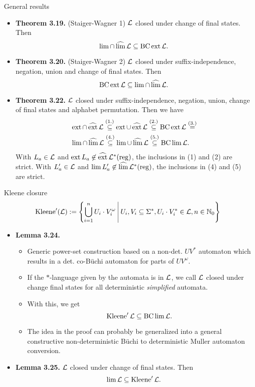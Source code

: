 \documentclass[
	notheorems,noamsthm]{beamer}
\begin{document}
\begin{frame}[<+->]{General results}
\begin{itemize}
\item \textbf{Theorem 3.19.} (Staiger-Wagner 1) $\mathcal{L}$ closed under change of final states. Then
\[ \lim \cap \operatorname{\widehat{lim}} \mathcal{L} \subseteq \operatorname{BC} \operatorname{ext} \mathcal{L} . \]
\item \textbf{Theorem 3.20.} (Staiger-Wagner 2) $\mathcal{L}$ closed under suffix-independence, negation, union and change of final states. Then
\[ \operatorname{BC} \operatorname{ext} \mathcal{L} \subseteq \lim \cap \operatorname{\widehat{lim}} \mathcal{L} . \]
\item \textbf{Theorem 3.22.} $\mathcal{L}$ closed under suffix-independence, negation, union, change of final states and alphabet permutation.
Then we have
\begin{align*}
& \operatorname{ext} \cap \operatorname{\widehat{ext}} \mathcal{L} \stackrel{(1.)}\subseteq
\operatorname{ext} \cup \operatorname{\widehat{ext}} \mathcal{L} \stackrel{(2.)}\subseteq
\operatorname{BC} \operatorname{ext} \mathcal{L} \stackrel{(3.)}= \\
& \lim \cap \operatorname{\widehat{lim}} \mathcal{L} \stackrel{(4.)}\subseteq
\lim \cup \operatorname{\widehat{lim}} \mathcal{L} \stackrel{(5.)}\subseteq
\operatorname{BC} \lim \mathcal{L} .
\end{align*}
With $L_a \in \mathcal{L}$ and $\operatorname{ext} L_a \not\in \operatorname{\widehat{ext}} \mathcal{L}^*(\textup{\textrm{reg}})$, the inclusions in (1) and (2) are strict.
With $L'_a \in \mathcal{L}$ and  $\lim L'_a \not\in \operatorname{\widehat{lim}} \mathcal{L}^*(\textup{\textrm{reg}})$, the inclusions in (4) and (5) are strict.\end{itemize}
\end{frame}

\begin{frame}[<+->]{Kleene closure}
\[ \Kleene'(\Lang) := \Set{ \bigcup_{i=1}^n U_i \cdot V_i^\omega}{U_i, V_i \subseteq \Sigma^*, U_i \cdot V_i^* \in \Lang, n \in \N_0} \]

\begin{itemize}
\item \textbf{Lemma 3.24.}
\begin{itemize}
\item Generic power-set construction based on a non-det. $U V^*$ automaton which results in a det. co-Büchi automaton for parts of $U V^\omega$.
\item If the $*$-language given by the automata is in $\mathcal{L}$, we call $\mathcal{L}$ closed under change final states for all deterministic \emph{simplified} automata.
\item With this, we get
\[ \operatorname{Kleene}' \mathcal{L} \subseteq \operatorname{BC} \lim \mathcal{L} . \]
\item The idea in the proof can probably be generalized into a general constructive non-deterministic Büchi to deterministic Muller automaton conversion.
\end{itemize}

\item \textbf{Lemma 3.25.} $\mathcal{L}$ closed under change of final states. Then
\[ \lim \mathcal{L} \subseteq \operatorname{Kleene}' \mathcal{L} . \]
\end{itemize}
\end{frame}
\end{document}
